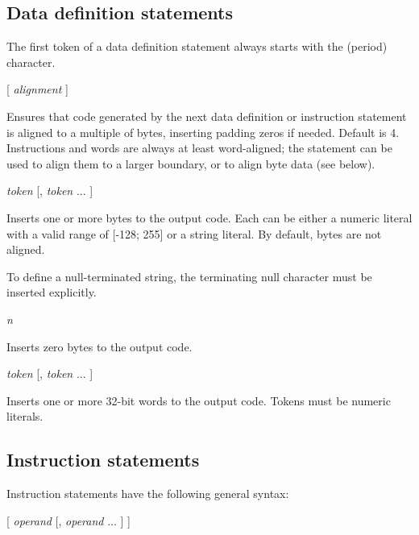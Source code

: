 \documentclass[a4paper,12pt,twoside,extrafontsizes]{memoir}
\begin{document}
\subsection{Data definition statements}

The first token of a data definition statement always starts with the  (period) character.

\begin{codepar}
 [ \emph{alignment} ]
\end{codepar}

Ensures that code generated by the next data definition or instruction statement is aligned to a multiple of  bytes, inserting padding zeros if needed. Default  is 4. Instructions and words are always at least word-aligned; the  statement can be used to align them to a larger boundary, or to align byte data (see below).

\begin{codepar}
 \emph{token} [, \emph{token} ... ]
\end{codepar}

Inserts one or more bytes to the output code. Each  can be either a numeric literal with a valid range of [-128; 255] or a string literal. By default, bytes are not aligned.

To define a null-terminated string, the terminating null character must be inserted explicitly.

\begin{codepar}
 \emph{n}
\end{codepar}

Inserts  zero bytes to the output code.

\begin{codepar}
 \emph{token} [, \emph{token} ... ]
\end{codepar}

Inserts one or more 32-bit words to the output code. Tokens must be numeric literals.

\subsection{Instruction statements}

Instruction statements have the following general syntax:

\begin{codepar}
     [ \emph{operand} [, \emph{operand} ... ] ]
\end{codepar}
\end{document}
